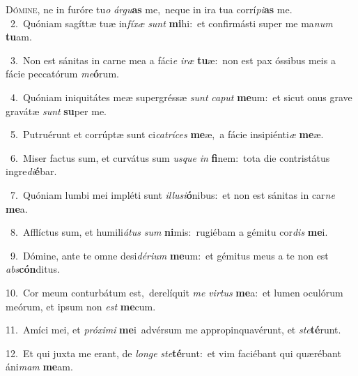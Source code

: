 \lettrine{\initial\textcolor{\initialcolor}{D}}{ómine,} ne in furóre tu\textit{o} \textit{ár}\-\textit{gu}\textbf{as} me,~\star neque in ira tua corrí\-\textit{pi}\-\textbf{as} me.\\
{\numbfont\textcolor{\numbcolor}{~2.}}~Quóniam sagíttæ tuæ in\-\textit{fí}\-\textit{xæ} \textit{sunt} \textbf{mi}\-hi:~\star et confirmásti super me ma\textit{num} \textbf{tu}\-am.\par
{\numbfont\textcolor{\numbcolor}{~3.}}~Non est sánitas in carne mea a fáci\textit{e} \textit{i}\-\textit{ræ} \textbf{tu}\-æ:~\star non est pax óssibus meis a fácie peccatórum \textit{me}\-\textbf{ó}rum.\par
{\numbfont\textcolor{\numbcolor}{~4.}}~Quóniam iniquitátes meæ supergréssæ \textit{sunt} \textit{ca}\-\textit{put} \textbf{me}\-um:~\star et sicut onus grave gravátæ \textit{sunt} \textbf{su}\-per me.\par
{\numbfont\textcolor{\numbcolor}{~5.}}~Putruérunt et corrúptæ sunt ci\-\textit{ca}\-\textit{trí}\textit{ces} \textbf{me}\-æ,~\star a fácie insipiénti\textit{æ} \textbf{me}\-æ.\par
{\numbfont\textcolor{\numbcolor}{~6.}}~Miser factus sum, et curvátus sum \textit{us}\-\textit{que} \textit{in} \textbf{fi}\-nem:~\star tota die contristátus ingre\-\textit{di}\-\textbf{é}bar.\par
{\numbfont\textcolor{\numbcolor}{~7.}}~Quóniam lumbi mei impléti sunt \textit{il}\-\textit{lu}\textit{si}\textbf{ó}nibus:~\star et non est sánitas in car\textit{ne} \textbf{me}\-a.\par
{\numbfont\textcolor{\numbcolor}{~8.}}~Afflíctus sum, et humili\-\textit{á}\-\textit{tus} \textit{sum} \textbf{ni}\-mis:~\star rugiébam a gémitu cor\textit{dis} \textbf{me}\-i.\par
{\numbfont\textcolor{\numbcolor}{~9.}}~Dómine, ante te omne desi\-\textit{dé}\-\textit{ri}\textit{um} \textbf{me}\-um:~\star et gémitus meus a te non est \textit{abs}\-\textbf{cón}ditus.\par
{\numbfont\textcolor{\numbcolor}{10.}}~Cor meum conturbátum est,~\dagger derelíquit \textit{me} \textit{vir}\-\textit{tus} \textbf{me}\-a:~\star et lumen oculórum meórum, et ipsum non \textit{est} \textbf{me}\-cum.\par
{\numbfont\textcolor{\numbcolor}{11.}}~Amíci mei, et \textit{pró}\-\textit{xi}\textit{mi} \textbf{me}\-i~\star advérsum me appropinquavérunt, et \textit{ste}\-\textbf{té}runt.\par
{\numbfont\textcolor{\numbcolor}{12.}}~Et qui juxta me erant, de \textit{lon}\-\textit{ge} \textit{ste}\-\textbf{té}runt:~\star et vim faciébant qui quærébant áni\textit{mam} \textbf{me}\-am.\par
